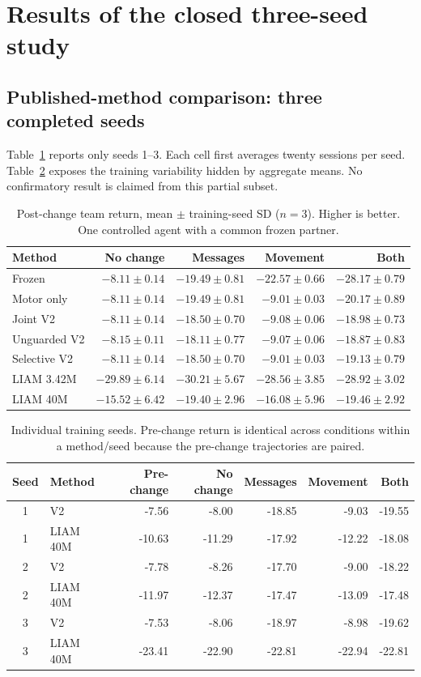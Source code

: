 \documentclass[10pt,a4paper]{article}
\begin{document}
\section{Results of the closed three-seed study}
\subsection{Published-method comparison: three completed seeds}
Table~\ref{tab:partial} reports only seeds 1--3. Each cell first averages twenty sessions per seed. Table~\ref{tab:seeds} exposes the training variability hidden by aggregate means. No confirmatory result is claimed from this partial subset.
\begin{table}[ht]
\centering\small
\caption{Post-change team return, mean $\pm$ training-seed SD ($n=3$). Higher is better. One controlled agent with a common frozen partner.}
\label{tab:partial}
\begin{tabular}{lrrrr}\toprule
Method & No change & Messages & Movement & Both \\\midrule
Frozen & $-8.11 \pm 0.14$ & $-19.49 \pm 0.81$ & $-22.57 \pm 0.66$ & $-28.17 \pm 0.79$ \\
Motor only & $-8.11 \pm 0.14$ & $-19.49 \pm 0.81$ & $-9.01 \pm 0.03$ & $-20.17 \pm 0.89$ \\
Joint V2 & $-8.11 \pm 0.14$ & $-18.50 \pm 0.70$ & $-9.08 \pm 0.06$ & $-18.98 \pm 0.73$ \\
Unguarded V2 & $-8.15 \pm 0.11$ & $-18.11 \pm 0.77$ & $-9.07 \pm 0.06$ & $-18.87 \pm 0.83$ \\
Selective V2 & $-8.11 \pm 0.14$ & $-18.50 \pm 0.70$ & $-9.01 \pm 0.03$ & $-19.13 \pm 0.79$ \\
LIAM 3.42M & $-29.89 \pm 6.14$ & $-30.21 \pm 5.67$ & $-28.56 \pm 3.85$ & $-28.92 \pm 3.02$ \\
LIAM 40M & $-15.52 \pm 6.42$ & $-19.40 \pm 2.96$ & $-16.08 \pm 5.96$ & $-19.46 \pm 2.92$ \\
\bottomrule\end{tabular}
\end{table}

\begin{table}[ht]
\centering\small
\caption{Individual training seeds. Pre-change return is identical across conditions within a method/seed because the pre-change trajectories are paired.}
\label{tab:seeds}
\begin{tabular}{clrrrrr}\toprule
Seed & Method & Pre-change & No change & Messages & Movement & Both \\\midrule
1 & V2 & -7.56 & -8.00 & -18.85 & -9.03 & -19.55 \\
1 & LIAM 40M & -10.63 & -11.29 & -17.92 & -12.22 & -18.08 \\
2 & V2 & -7.78 & -8.26 & -17.70 & -9.00 & -18.22 \\
2 & LIAM 40M & -11.97 & -12.37 & -17.47 & -13.09 & -17.48 \\
3 & V2 & -7.53 & -8.06 & -18.97 & -8.98 & -19.62 \\
3 & LIAM 40M & -23.41 & -22.90 & -22.81 & -22.94 & -22.81 \\
\bottomrule\end{tabular}
\end{table}
\end{document}

